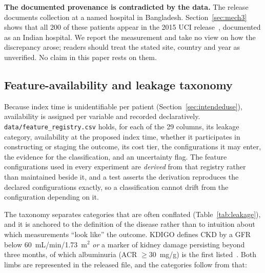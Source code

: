 \documentclass[conference]{IEEEtran}
\begin{document}
\textbf{The documented provenance is contradicted by the data.} The release
documents collection at a named hospital in Bangladesh. Section~\ref{sec:mech3}
shows that all 200 of these patients appear in the 2015 UCI
release~\cite{uci2015}, documented as an Indian hospital. We report the
measurement and take no view on how the discrepancy arose; readers should
treat the stated site, country and year as unverified. No claim in this paper
rests on them.

\subsection{Feature-availability and leakage taxonomy}
\label{sec:taxonomy}

Because index time is unidentifiable per patient
(Section~\ref{sec:intendeduse}), availability is assigned per variable and
recorded declaratively. \texttt{data/feature\_registry.csv} holds, for each
of the 29 columns, its leakage category, availability at the proposed index
time, whether it participates in constructing or staging the outcome, its
cost tier, the configurations it may enter, the evidence for the
classification, and an uncertainty flag. The feature configurations used in
every experiment are \emph{derived} from that registry rather than
maintained beside it, and a test asserts the derivation reproduces the
declared configurations exactly, so a classification cannot drift from the
configuration depending on it.

The taxonomy separates categories that are often conflated
(Table~\ref{tab:leakage}), and it is anchored to the definition of the
disease rather than to intuition about which measurements ``look like'' the
outcome. KDIGO defines CKD by a GFR below 60~mL/min/1.73~m$^2$ \emph{or} a
marker of kidney damage persisting beyond three months, of which albuminuria
(ACR $\geq 30$~mg/g) is the first listed~\cite{kdigo2024}. Both limbs are
represented in the released file, and the categories follow from that:
\end{document}
